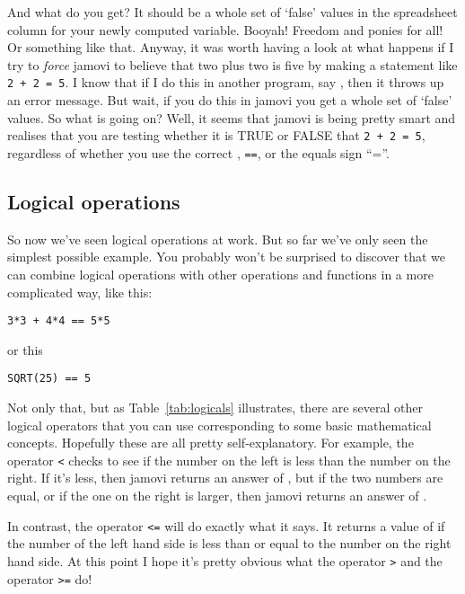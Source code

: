 \noindent
And what do you get? It should be a whole set of `false' values in the spreadsheet column for your newly computed variable. Booyah! Freedom and ponies for all! Or something like that. Anyway, it was worth having a look at what happens if I try to {\it force} jamovi to believe that two plus two is five by making a statement like \texttt{2 + 2 = 5}. I know that if I do this in another program, say \R, then it throws up an error message. But wait, if you do this in jamovi you get a whole set of `false' values. So what is going on? Well, it seems that jamovi is being pretty smart and realises that you are testing whether it is TRUE or FALSE that \texttt{2 + 2 = 5}, regardless of whether you use the correct , \texttt{==}, or the equals sign ``=''. 

\subsection{Logical operations}

So now we've seen logical operations at work. But so far we've only seen the simplest possible example. You probably won't be surprised to discover that we can combine logical operations with other operations and functions in a more complicated way, like this:
\begin{verbatim}
3*3 + 4*4 == 5*5
\end{verbatim} 
or this
\begin{verbatim}
SQRT(25) == 5
\end{verbatim}
Not only that, but as Table~\ref{tab:logicals} illustrates, there are several other logical operators that you can use corresponding to some basic mathematical concepts. Hopefully these are all pretty self-explanatory. For example, the  operator \texttt{<} checks to see if the number on the left is less than the number on the right. If it's less, then jamovi returns an answer of , but if the two numbers are equal, or if the one on the right is larger, then jamovi returns an answer of .

In contrast, the  operator \verb#<=# will do exactly what it says. It returns a value of  if the number of the left hand side is less than or equal to the number on the right hand side. At this point I hope it's pretty obvious what the  operator \texttt{>} and the  operator \verb#>=# do! 

